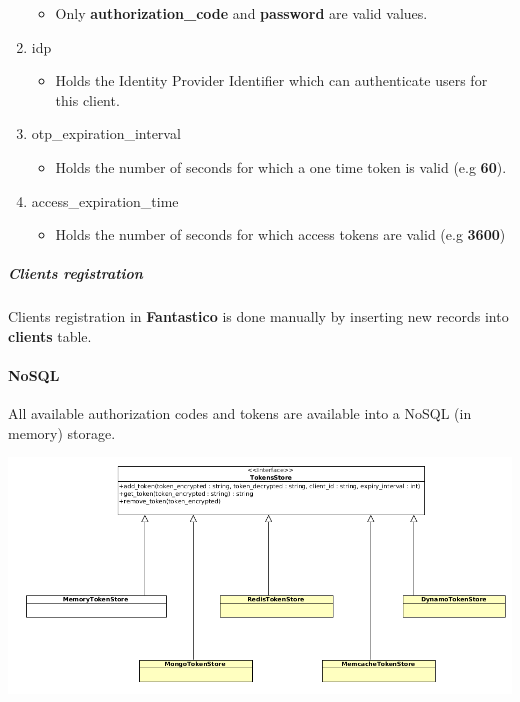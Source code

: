 \documentclass[letterpaper,10pt,english]{sphinxmanual}
\begin{document}
\begin{enumerate}
\begin{itemize}
\item {} 
Only \textbf{authorization\_code} and \textbf{password} are valid values.

\end{itemize}

\item {} 
idp
\begin{itemize}
\item {} 
Holds the Identity Provider Identifier which can authenticate users for this client.

\end{itemize}

\item {} 
otp\_expiration\_interval
\begin{itemize}
\item {} 
Holds the number of seconds for which a one time token is valid (e.g \textbf{60}).

\end{itemize}

\item {} 
access\_expiration\_time
\begin{itemize}
\item {} 
Holds the number of seconds for which access tokens are valid (e.g \textbf{3600})

\end{itemize}

\end{enumerate}


\subparagraph{Clients registration}
\label{features/oauth2/tokens_storage:clients-registration}
Clients registration in \textbf{Fantastico} is done manually by inserting new records into \textbf{clients} table.


\paragraph{NoSQL}
\label{features/oauth2/tokens_storage:nosql}
All available authorization codes and tokens are available into a NoSQL (in memory) storage.

\includegraphics{tokens_storage.png}
\end{document}
